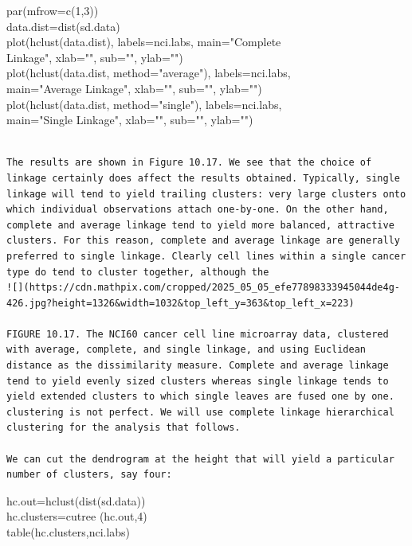 \documentclass[10pt]{article}
\begin{document}
\begin{displayquote}
par(mfrow=c(1,3))\\
data.dist=dist(sd.data)\\
plot(hclust(data.dist), labels=nci.labs, main="Complete\\
Linkage", xlab="", sub="", ylab="")\\
plot(hclust(data.dist, method="average"), labels=nci.labs,\\
main="Average Linkage", xlab="", sub="", ylab="")\\
plot(hclust(data.dist, method="single"), labels=nci.labs,\\
main="Single Linkage", xlab="", sub="", ylab="")
\end{displayquote}

\begin{verbatim}

The results are shown in Figure 10.17. We see that the choice of linkage certainly does affect the results obtained. Typically, single linkage will tend to yield trailing clusters: very large clusters onto which individual observations attach one-by-one. On the other hand, complete and average linkage tend to yield more balanced, attractive clusters. For this reason, complete and average linkage are generally preferred to single linkage. Clearly cell lines within a single cancer type do tend to cluster together, although the
![](https://cdn.mathpix.com/cropped/2025_05_05_efe77898333945044de4g-426.jpg?height=1326&width=1032&top_left_y=363&top_left_x=223)

FIGURE 10.17. The NCI60 cancer cell line microarray data, clustered with average, complete, and single linkage, and using Euclidean distance as the dissimilarity measure. Complete and average linkage tend to yield evenly sized clusters whereas single linkage tends to yield extended clusters to which single leaves are fused one by one.
clustering is not perfect. We will use complete linkage hierarchical clustering for the analysis that follows.

We can cut the dendrogram at the height that will yield a particular number of clusters, say four:
\end{verbatim}

\begin{displayquote}
hc.out=hclust(dist(sd.data))\\
hc.clusters=cutree (hc.out,4)\\
table(hc.clusters,nci.labs)
\end{displayquote}
\end{document}
